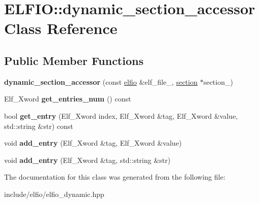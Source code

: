 \hypertarget{class_e_l_f_i_o_1_1dynamic__section__accessor}{}\section{E\+L\+F\+IO\+:\+:dynamic\+\_\+section\+\_\+accessor Class Reference}
\label{class_e_l_f_i_o_1_1dynamic__section__accessor}
\subsection*{Public Member Functions}
\begin{DoxyCompactItemize}
\item 
{\bfseries dynamic\+\_\+section\+\_\+accessor} (const \hyperlink{class_e_l_f_i_o_1_1elfio}{elfio} \&elf\+\_\+file\+\_\+, \hyperlink{class_e_l_f_i_o_1_1section}{section} $\ast$section\+\_\+)\hypertarget{class_e_l_f_i_o_1_1dynamic__section__accessor_a31a9043e5e6d303fe0fc0c0fc5af54a7}{}\label{class_e_l_f_i_o_1_1dynamic__section__accessor_a31a9043e5e6d303fe0fc0c0fc5af54a7}

\item 
Elf\+\_\+\+Xword {\bfseries get\+\_\+entries\+\_\+num} () const \hypertarget{class_e_l_f_i_o_1_1dynamic__section__accessor_a4a1f80115e8385d2ebfe0820c4862bd0}{}\label{class_e_l_f_i_o_1_1dynamic__section__accessor_a4a1f80115e8385d2ebfe0820c4862bd0}

\item 
bool {\bfseries get\+\_\+entry} (Elf\+\_\+\+Xword index, Elf\+\_\+\+Xword \&tag, Elf\+\_\+\+Xword \&value, std\+::string \&str) const \hypertarget{class_e_l_f_i_o_1_1dynamic__section__accessor_a96572acd12da838914034ab7c6993d65}{}\label{class_e_l_f_i_o_1_1dynamic__section__accessor_a96572acd12da838914034ab7c6993d65}

\item 
void {\bfseries add\+\_\+entry} (Elf\+\_\+\+Xword \&tag, Elf\+\_\+\+Xword \&value)\hypertarget{class_e_l_f_i_o_1_1dynamic__section__accessor_adfdb7de723834790b364da662c146b38}{}\label{class_e_l_f_i_o_1_1dynamic__section__accessor_adfdb7de723834790b364da662c146b38}

\item 
void {\bfseries add\+\_\+entry} (Elf\+\_\+\+Xword \&tag, std\+::string \&str)\hypertarget{class_e_l_f_i_o_1_1dynamic__section__accessor_a1b39689421c68493e3582bf432db4351}{}\label{class_e_l_f_i_o_1_1dynamic__section__accessor_a1b39689421c68493e3582bf432db4351}

\end{DoxyCompactItemize}


The documentation for this class was generated from the following file\+:\begin{DoxyCompactItemize}
\item 
include/elfio/elfio\+\_\+dynamic.\+hpp\end{DoxyCompactItemize}
